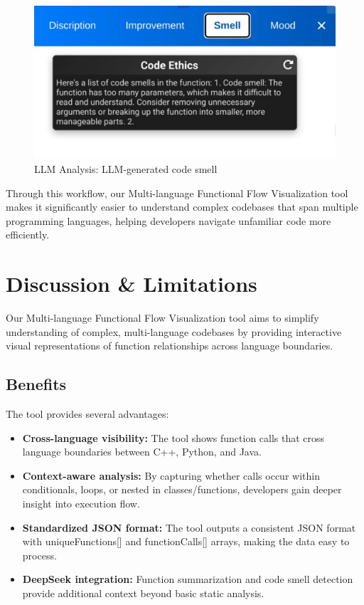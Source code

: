 \documentclass[10pt,twocolumn]{article}
\begin{document}
\begin{figure}
    \centering
    \includegraphics[width=1\linewidth]{image6.png}
    \caption{LLM Analysis: LLM-generated code smell}
    \label{fig:enter-label}
\end{figure}
Through this workflow, our Multi-language Functional Flow Visualization tool makes it significantly easier to understand complex codebases that span multiple programming languages, helping developers navigate unfamiliar code more efficiently.

\section{Discussion \& Limitations}

Our Multi-language Functional Flow Visualization tool aims to simplify understanding of complex, multi-language codebases by providing interactive visual representations of function relationships across language boundaries.

\subsection{Benefits}

The tool provides several advantages:
\begin{itemize}
    \item \textbf{Cross-language visibility:} The tool shows function calls that cross language boundaries between C++, Python, and Java.
    \item \textbf{Context-aware analysis:} By capturing whether calls occur within conditionals, loops, or nested in classes/functions, developers gain deeper insight into execution flow.
    \item \textbf{Standardized JSON format:} The tool outputs a consistent JSON format with uniqueFunctions[] and functionCalls[] arrays, making the data easy to process.
    \item \textbf{DeepSeek integration:} Function summarization and code smell detection provide additional context beyond basic static analysis.
\end{itemize}
\end{document}
